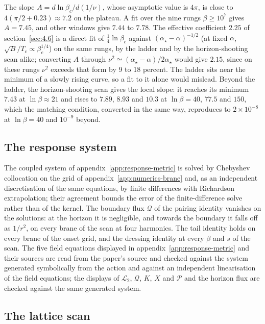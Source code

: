 The slope $A = d\ln\beta_c/d(1/\nu)$, whose asymptotic value is $4\pi$, is
close to $4(\pi/2 + 0.23) \approx 7.2$ on the plateau. A fit over the nine
rungs $\beta \ge 10^7$ gives $A = 7.45$, and other windows give $7.44$ to
$7.78$. The effective coefficient $2.25$ of section~\ref{sec:4.6} is a direct
fit of $\tfrac14\ln\beta_c$ against $(\alpha_\star - \alpha)^{-1/2}$
(at fixed $\alpha$, $\sqrt B/T_c \propto \beta_c^{1/4}$) on the same
rungs, by the ladder and by the horizon-shooting scan alike; converting $A$
through $\nu^2 \simeq (\alpha_\star - \alpha)/2\alpha_\star$ would give
$2.15$, since on these rungs $\nu^2$ exceeds that form by 9 to 18 percent.
The ladder sits near the minimum of a slowly rising curve, so a fit to it
alone would mislead. Beyond the ladder, the horizon-shooting scan gives the
local slope: it reaches its minimum $7.43$ at $\ln\beta \approx 21$ and rises to $7.89$,
$8.93$ and $10.3$ at $\ln\beta = 40$, $77.5$ and $150$, which the matching
condition, converted in the same way, reproduces to $2\times10^{-8}$ at
$\ln\beta = 40$ and $10^{-9}$ beyond.

\subsection{The response system}
\label{app:numerics-response}

The coupled system of appendix~\ref{app:response-metric} is solved by
Chebyshev collocation on the grid of appendix~\ref{app:numerics-brane} and,
as an independent discretisation of the same equations, by finite
differences with Richardson extrapolation; their agreement bounds the error
of the finite-difference solve rather than of the kernel. The boundary flux
$\mathcal{Q}$ of the pairing identity vanishes on the solutions: at the
horizon it is negligible, and towards the boundary it falls off as $1/r^2$,
on every brane of the scan at four harmonics. The tail identity
holds on every brane of the onset grid, and the dressing identity
at every $\beta$ and $s$ of the scan. The five field equations displayed in
appendix~\ref{app:response-metric} and their sources are read from the
paper's source and checked against the system generated symbolically from
the action and against an independent linearisation of the field equations;
the displays of $\mathcal{L}_2$, $\mathcal{Q}$, $K$, $X$ and $\mathcal{P}$
and the horizon flux are checked against the same generated system.

\subsection{The lattice scan}
\label{app:numerics-scan}

